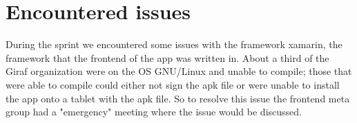 \section{Encountered issues}
During the sprint we encountered some issues with the framework xamarin, the framework that the frontend of the app was written in. 
About a third of the Giraf organization were on the OS GNU/Linux and unable to compile; those that were able to compile could either not sign the apk file or were unable to install the app onto a tablet with the apk file.
So to resolve this issue the frontend meta group had a "emergency" meeting where the issue would be discussed.

